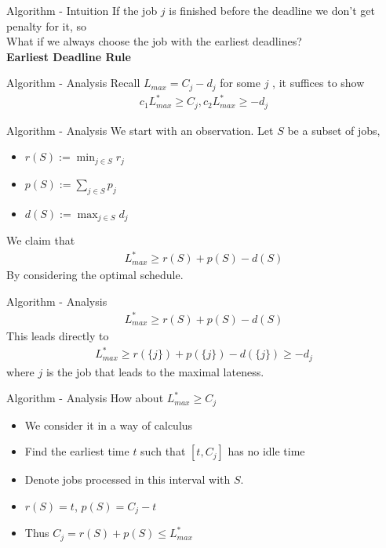 \documentclass{beamer}
\newcommand*{\brk}{\\[10pt]}
\begin{document}
\begin{frame}{Algorithm - Intuition}
    If the job $j$ is finished before the deadline we don't get penalty for it, so \brk 
    What if we always choose the job with the earliest deadlines? \brk 
    \textbf{Earliest Deadline Rule}
\end{frame}

\begin{frame}{Algorithm - Analysis}
    Recall $L_{max} = C_j - d_j$ for some $j$ , it suffices to show
    \begin{align*}
        c_1L_{max}^* \geq C_j,  c_2L_{max}^* \geq -d_j
    \end{align*}
\end{frame}

\begin{frame}{Algorithm - Analysis}
    We start with an observation. 
    Let $S$ be a subset of jobs,
    \begin{itemize}
        \item $r(S) := \min_{j \in S} r_j$ 
        \item $p(S) := \sum_{j \in S} p_j$ 
        \item $d(S) := \max_{j \in S} d_j$
    \end{itemize}
    We claim that
    \begin{align*}
        L_{max}^* \geq r(S) + p(S) - d(S)
    \end{align*}
    By considering the optimal schedule.
\end{frame}

\begin{frame}{Algorithm - Analysis}
    \begin{align*}
        L_{max}^* \geq r(S) + p(S) - d(S)
    \end{align*}
    This leads directly to 
    \begin{align*}
        L_{max}^* \geq r(\{j\}) + p(\{j\}) - d(\{j\}) \geq -d_j
    \end{align*}
    where $j$ is the job that leads to the maximal lateness. 
\end{frame}


\begin{frame}{Algorithm - Analysis}
    \color{red} How about $L_{max}^* \geq C_j$ \color{black} 
    \begin{itemize}
        \item<1-> We consider it in a way of calculus
        \item<2-> Find the earliest time $t$ such that $[t, C_j]$ has no idle time 
        \item<3-> Denote jobs processed in this interval with $S$.
        \item<4-> $r(S) = t$, $p(S) = C_j - t$ 
        \item<5> Thus $C_j = r(S) + p(S) \leq L_{max}^*$ 
    \end{itemize}
\end{frame}
\end{document}
